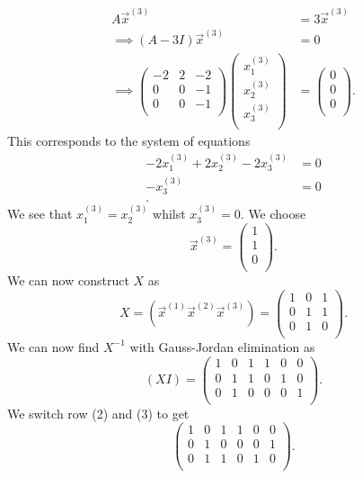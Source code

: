 \begin{align*}
  A \Vec{x}^{(3)} &= 3 \Vec{x}^{(3)} \\
  \implies (A - 3I) \Vec{x}^{(3)} &= 0 \\
  \implies \begin{pmatrix}
  -2 & 2 & -2\\
  0 & 0 & -1\\
  0 & 0 & -1\\
  \end{pmatrix} \begin{pmatrix}
  x_1^{(3)}\\
  x_2^{(3)}\\
  x_3^{(3)}\\
  \end{pmatrix} &= \begin{pmatrix}
  0\\
  0\\
  0\\
  \end{pmatrix}
.\end{align*}
This corresponds to the system of equations
\begin{align*}
  -2x_1^{(3)} + 2x_2^{(3)} -2x_3^{(3)} &= 0 \\
  -x_3^{(3)} &= 0 \\
.\end{align*}
We see that $x_1^{(3)} = x_2^{(3)}$ whilst $x_3^{(3)} = 0$. We choose
\[ 
\Vec{x}^{(3)} = \begin{pmatrix}
1\\
1\\
0\\
\end{pmatrix}
.\]
We can now construct $X$ as
\[ 
X = (\Vec{x}^{(1)} \Vec{x}^{(2)} \Vec{x}^{(3)}) = \begin{pmatrix}
1 & 0 & 1\\
0 & 1 & 1\\
0 & 1 & 0\\
\end{pmatrix}
.\]
We can now find $X^{-1}$ with Gauss-Jordan elimination as
\[
  (XI) = \left( \begin{array}{ccc|ccc}
  1 & 0 & 1 & 1 & 0 & 0\\
  0 & 1 & 1 & 0 & 1 & 0\\
  0 & 1 & 0 & 0 & 0 & 1\\
  \end{array} \right)
.\]
We switch row (2) and (3) to get
\[ 
\left( \begin{array}{ccc|ccc}
1 & 0 & 1 & 1 & 0 & 0\\
0 & 1 & 0 & 0 & 0 & 1\\
0 & 1 & 1 & 0 & 1 & 0\\
\end{array} \right)
.\]
